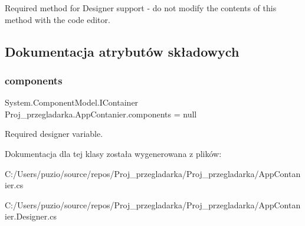 Required method for Designer support -\/ do not modify the contents of this method with the code editor. 



\subsection{Dokumentacja atrybutów składowych}
\mbox{\label{class_proj__przegladarka_1_1_app_contanier_a9a97b5b41b1084b2642d76c95620566f}} 
\subsubsection{\texorpdfstring{components}{components}}
{\footnotesize\ttfamily System.\+Component\+Model.\+I\+Container Proj\+\_\+przegladarka.\+App\+Contanier.\+components = null\hspace{0.3cm}{\ttfamily [private]}}



Required designer variable. 



Dokumentacja dla tej klasy została wygenerowana z plików\+:\begin{DoxyCompactItemize}
\item 
C\+:/\+Users/puzio/source/repos/\+Proj\+\_\+przegladarka/\+Proj\+\_\+przegladarka/App\+Contanier.\+cs\item 
C\+:/\+Users/puzio/source/repos/\+Proj\+\_\+przegladarka/\+Proj\+\_\+przegladarka/App\+Contanier.\+Designer.\+cs\end{DoxyCompactItemize}

